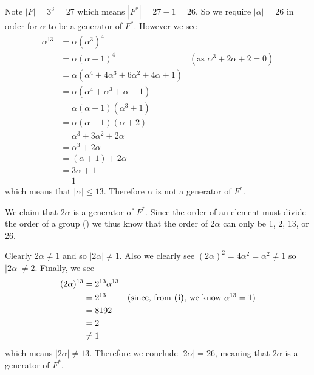 \begin{questions}
\begin{partquestions}{\roman*}
        \item Note $|F| = 3^3 = 27$ which means $|F^\ast| = 27 - 1 = 26$. So we require $|\alpha| = 26$ in order for $\alpha$ to be a generator of $F^\ast$. However we see
        \begin{align*}
            \alpha^{13} &= \alpha(\alpha^3)^4\\
            &= \alpha(\alpha + 1)^4 & (\text{as }\alpha^3 + 2\alpha + 2 = 0)\\
            &= \alpha(\alpha^4 + 4\alpha^3 + 6\alpha^2 + 4\alpha + 1)\\
            &= \alpha(\alpha^4 + \alpha^3 + \alpha + 1)\\
            &= \alpha(\alpha+1)(\alpha^3+1)\\
            &= \alpha(\alpha+1)(\alpha+2)\\
            &= \alpha^3 + 3\alpha^2 + 2\alpha\\
            &= \alpha^3 + 2\alpha\\
            &= (\alpha + 1) + 2\alpha\\
            &= 3\alpha + 1\\
            &= 1
        \end{align*}
        which means that $|\alpha| \leq 13$. Therefore $\alpha$ is not a generator of $F^\ast$.

        \item We claim that $2\alpha$ is a generator of $F^\ast$. Since the order of an element must divide the order of a group () we thus know that the order of $2\alpha$ can only be 1, 2, 13, or 26.

        Clearly $2\alpha \neq 1$ and so $|2\alpha| \neq 1$. Also we clearly see $(2\alpha)^2 = 4\alpha^2 = \alpha^2 \neq 1$ so $|2\alpha| \neq 2$. Finally, we see
        \begin{align*}
            (2\alpha)^{13} &= 2^{13}\alpha^{13}\\
            &= 2^{13} & (\text{since, from \textbf{(i)}, we know }\alpha^{13} = 1)\\
            &= 8192\\
            &= 2\\
            &\neq 1
        \end{align*}
        which means $|2\alpha| \neq 13$. Therefore we conclude $|2\alpha| = 26$, meaning that $2\alpha$ is a generator of $F^\ast$.
    \end{partquestions}


\end{questions}
